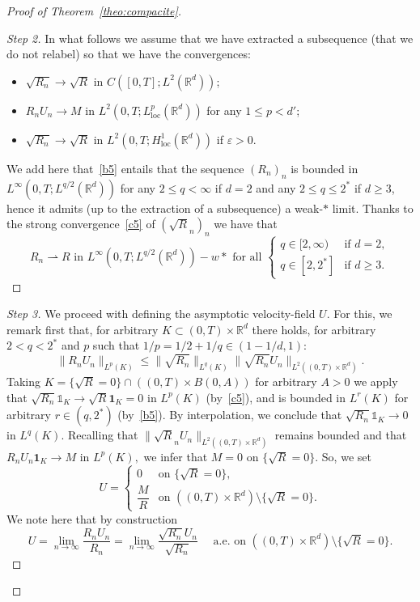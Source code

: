 \documentclass[10pt]{amsart}
\theoremstyle{definition}\newtheorem{defi}[theo]{Definition}\newtheorem{rema}[theo]{Remark}\newtheorem{exam}[theo]{Example}\newtheorem{exem}[theo]{Example}\newtheorem{nota}[theo]{Notation}
\newcommand*{\un}{\mathds{1}}
\newcommand*{\loc}{\mathrm{loc}}
\newcommand*\<{\left\langle}
\renewcommand*\>{\right\rangle}
\renewcommand*\le{\leqslant}
\renewcommand*\ge{\geqslant}
\newcommand*\eps{\varepsilon}
\begin{document}
\begin{proof}[Proof of Theorem~\ref{theo:compacite}]
\begin{proof}[Step 2]
\goodbreak
In what follows we assume that we have extracted a subsequence (that we do not relabel) so that we have the convergences:
\begin{itemize}
\item $\sqrt{R_n} \to \sqrt{R}$ in $C([0,T];L^2(\mathbb R^d))$;
\item $R_n U_n \to M$ in $L^2(0,T;L^p_{\loc}(\mathbb R^d))$ for any $1 \le p < d'$;
\item $\sqrt{R_n} \to \sqrt{R}$ in $L^2(0,T;H^{1}_{\loc}(\mathbb R^d))$ if $\eps > 0$.
\end{itemize}
We add here that~\eqref{b5} entails that the sequence $(R_n)_{n}$ is bounded in\linebreak $L^{\infty}(0,T;L^{q/2}(\mathbb R^d))$ for any $2\le q < \infty$ if $d=2$ and any $2 \le q \le 2^*$ if $d \ge 3$, hence it admits (up to the extraction of a subsequence) a weak-$*$ limit. Thanks to the strong convergence~\eqref{c5} of $(\sqrt{R}_n)_n$ we have that
\begin{equation*}\label{eq_cvgcdensity}
\tag{c7}
R_n \rightharpoonup R \text{ in $L^{\infty}(0,T;L^{q/2}(\mathbb R^d))-w*$ for all }
\begin{cases}
q \in [2,\infty) &\text{if } d = 2, \\
q \in [2,2^*] &\text{if } d \ge 3.
\end{cases}
\end{equation*}
\let\qed\relax
\end{proof}

\begin{proof}[Step 3]
We proceed with defining the asymptotic velocity-field $U.$ For this, we remark first that, for arbitrary $K\subset (0,T) \times \mathbb R^d$ there holds, for arbitrary $ 2 < q <2^*$ and $p$ such that $1/p= 1/2 + 1/q \in (1 - 1/d,1):$
\[
\|R_n U_n\|_{L^p(K)} \le \|\sqrt{R_n}\|_{L^{q}(K)} \|\sqrt{R_n} U_n\|_{L^2((0,T) \times \mathbb R^d)}.
\]
Taking $K = \{\sqrt{R} =0\} \cap \left((0,T) \times B(0,A)\right)$ for arbitrary $A >0$ we apply that $\sqrt{R_n} \un_{K} \to \sqrt R \mathbf 1_K = 0$ in $L^p(K)$ (by~\eqref{c5}), and is bounded in $L^{r}(K)$ for arbitrary $r \in (q,2^*)$ (by~\eqref{b5}). By interpolation, we conclude that $\sqrt{R_n} \un_{K} \to 0$ in $L^q(K).$ Recalling that $\|\sqrt{R}_n U_n\|_{L^2((0,T) \times \mathbb R^d)}$ remains bounded and that $R_n U_n \mathbf 1_{K} \to M$ in $L^p(K),$ we infer that $M = 0$ on $\{\sqrt{R}=0\}.$ So, we set
\[
U=\begin{cases}
0 & \text{on }\{\sqrt{R} = 0\},\\
\dfrac{M}{R} & \text{on }\left((0,T) \times \mathbb R^d\right) \setminus \{\sqrt{R} = 0\}.
\end{cases}
\]
We note here that by construction
\[
U = \lim_{n \to \infty} \dfrac{R_n U_n}{R_n} = \lim_{n \to \infty}
\dfrac{\sqrt{R_n} U_n}{\sqrt{R_n}} \quad \text{ a.e. on $\left((0,T)
\times \mathbb R^d\right) \setminus \{\sqrt{R} = 0\}$}.
\]


\end{proof}
\end{proof}
\end{document}
